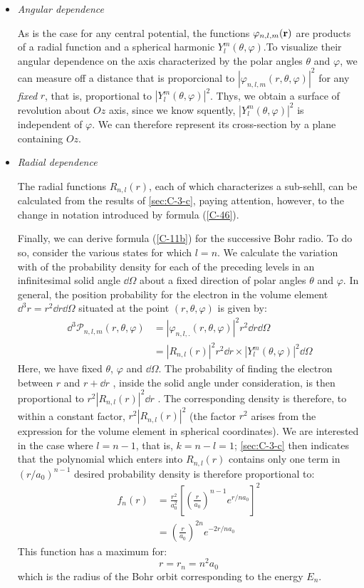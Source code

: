 \begin{itemize}
	\item \textit{Angular dependence}

		As is the case for any central potential, the functions $\varphi_{n,l,m}(\vb{r})$ are products of a radial function and a spherical harmonic $Y_l^m(\theta,\varphi)$.To visualize their angular dependence on the axis characterized by the polar angles $\theta$ and $\varphi$, we can measure off a distance that is proporcional to $|\varphi_{n,l,m}(r,\theta,\varphi)|^2$ for any \textit{fixed} $r$, that is, proportional to $|Y_l^m(\theta,\varphi)|^2$. Thys, we obtain a surface of revolution about $Oz$ axis, since we know squently, $|Y_l^m(\theta,\varphi)|^2$ is independent of $\varphi$. We can therefore represent its cross-section by a plane containing $Oz$.

	\item \textit{Radial dependence}

		The radial functions $R_{n,l}(r)$, each of which characterizes a sub-sehll, can be calculated from the results of \ref{sec:C-3-c}, paying attention, however, to the change in notation introduced by formula (\ref{C-46}). 
		
		Finally, we can derive formula (\ref{C-11b}) for the successive Bohr radio. To do so, consider the various states for which $l=n$. We calculate the variation with of the probability density for each of the preceding levels in an infinitesimal solid angle $\dd \Omega$ about a fixed direction of polar angles $\theta$ and $\varphi$. In general, the position probability for the electron in the volume element $\dd^3 r=r^2\dd r\dd\Omega$ situated at the point $(r,\theta,\varphi)$ is given by:
\begin{align}\
	\nonumber \dd^3\mathcal{P}_{n,l,m}(r,\theta,\varphi)&=|\varphi_{n,l,.}(r,\theta,\varphi)|^2r^2\dd r\dd\Omega\\
																											 &=|R_{n,l}(r)|^2r^2\dd r\times |Y_l^m(\theta,\varphi)|^2\dd\Omega\label{C-52}
\end{align}
Here, we have fixed $\theta$, $\varphi$ and $\dd\Omega$. The probability of finding the electron between $r$ and $r+\dd r$ , inside the solid angle under consideration, is then proportional to $r^2|R_{n,l}(r)|^2\dd r$ . The corresponding density is therefore, to within a constant factor, $r^2|R_{n,l}(r)|^2$ (the factor $r^2$ arises from the expression for the volume element in spherical coordinates). We are interested in the case where $l=n-1$, that is, $k=n-l=1$; \ref{sec:C-3-c} then indicates
that the polynomial which enters into $R_{n,l}(r)$ contains only one term in $(r/a_0)^{n-1}$ desired probability density is therefore proportional to:
\begin{align}
	\nonumber f_n(r)&=\frac{r^2}{a_0^2}\left[\left(\frac{r}{a_0}\right)^{n-1}e^{r/na_0}\right]^2\\
									&=\left(\frac{r}{a_0}\right)^{2n}e^{-2r/na_0}\label{C-54}
\end{align}
This function has a maximum for:
\begin{equation}\label{C-54}
	r=r_n=n^2a_0
\end{equation}
which is the radius of the Bohr orbit corresponding to the energy $E_n$.



\end{itemize}
